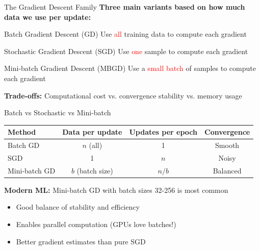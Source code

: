\documentclass[usenames,dvipsnames]{beamer}
\begin{document}
  \begin{frame}{The Gradient Descent Family}
    \textbf{Three main variants based on how much data we use per update:}
    
    \begin{definitionbox}{Batch Gradient Descent (GD)}
    Use \textcolor{red}{all} training data to compute each gradient
    \end{definitionbox}
    
    \begin{definitionbox}{Stochastic Gradient Descent (SGD)}
    Use \textcolor{red}{one} sample to compute each gradient
    \end{definitionbox}
    
    \begin{definitionbox}{Mini-batch Gradient Descent (MBGD)}
    Use a \textcolor{red}{small batch} of samples to compute each gradient
    \end{definitionbox}
    
    \pause
    \textbf{Trade-offs:} Computational cost vs. convergence stability vs. memory usage
  \end{frame}

  \begin{frame}{Batch vs Stochastic vs Mini-batch}
    \begin{center}
    \begin{tabular}{|l|c|c|c|}
        \hline
        \textbf{Method} & \textbf{Data per update} & \textbf{Updates per epoch} & \textbf{Convergence} \\
        \hline
        Batch GD & $n$ (all) & 1 & Smooth \\
        \hline
        SGD & 1 & $n$ & Noisy \\
        \hline
        Mini-batch GD & $b$ (batch size) & $n/b$ & Balanced \\
        \hline
    \end{tabular}
    \end{center}
    
    \pause
    \begin{keypointsbox}
    \textbf{Modern ML:} Mini-batch GD with batch sizes 32-256 is most common
    \begin{itemize}
        \item Good balance of stability and efficiency
        \item Enables parallel computation (GPUs love batches!)
        \item Better gradient estimates than pure SGD
    \end{itemize}
    \end{keypointsbox}
  \end{frame}
\end{document}
